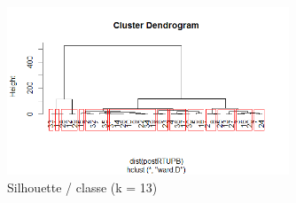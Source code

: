 \begin{figure}[H]
\centering
\includegraphics[width=0.75\textwidth]{../Fig/RTUPB/rtupb-cah-k13-post.png}
\caption{Silhouette / classe (k = 13)}
\end{figure}



%
